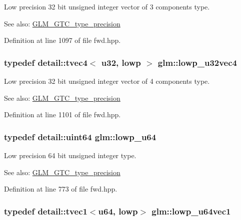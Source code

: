 Low precision 32 bit unsigned integer vector of 3 components type. \begin{Desc}
\item[See also:]\hyperlink{group__gtc__type__precision}{GLM\_\-GTC\_\-type\_\-precision} \end{Desc}


Definition at line 1097 of file fwd.hpp.\hypertarget{group__gtc__type__precision_gad6408408c9c5321cb6ee54f201de578}{
\subsubsection[lowp\_\-u32vec4]{\setlength{\rightskip}{0pt plus 5cm}typedef detail::tvec4$<$ u32, lowp $>$ {\bf glm::lowp\_\-u32vec4}}}
\label{group__gtc__type__precision_gad6408408c9c5321cb6ee54f201de578}


Low precision 32 bit unsigned integer vector of 4 components type. \begin{Desc}
\item[See also:]\hyperlink{group__gtc__type__precision}{GLM\_\-GTC\_\-type\_\-precision} \end{Desc}


Definition at line 1101 of file fwd.hpp.\hypertarget{group__gtc__type__precision_g61ed4c68a4cffb77cd63cc107119123a}{
\subsubsection[lowp\_\-u64]{\setlength{\rightskip}{0pt plus 5cm}typedef detail::uint64 {\bf glm::lowp\_\-u64}}}
\label{group__gtc__type__precision_g61ed4c68a4cffb77cd63cc107119123a}


Low precision 64 bit unsigned integer type. \begin{Desc}
\item[See also:]\hyperlink{group__gtc__type__precision}{GLM\_\-GTC\_\-type\_\-precision} \end{Desc}


Definition at line 773 of file fwd.hpp.\hypertarget{group__gtc__type__precision_gcd97dc5e92d0e2f6f6d62a5160508e2a}{
\subsubsection[lowp\_\-u64vec1]{\setlength{\rightskip}{0pt plus 5cm}typedef detail::tvec1$<$u64, lowp$>$ {\bf glm::lowp\_\-u64vec1}}}
\label{group__gtc__type__precision_gcd97dc5e92d0e2f6f6d62a5160508e2a}


